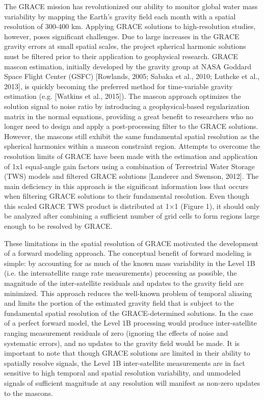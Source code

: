 \documentclass[review,oneside]{igs}
\begin{document}
The GRACE mission has revolutionized our ability to monitor global water mass variability by mapping the Earth’s gravity field each month with a spatial resolution of 300-400 km. Applying GRACE solutions to high-resolution studies, however, poses significant challenges. Due to large increases in the GRACE gravity errors at small spatial scales, the project spherical harmonic solutions must be filtered prior to their application to geophysical research. GRACE mascon estimation, initially developed by the gravity group at NASA Goddard Space Flight Center (GSFC) [Rowlands, 2005; Sabaka et al., 2010; Luthcke et al., 2013], is quickly becoming the preferred method for time-variable gravity estimation (e.g. [Watkins et al., 2015]). The mascon approach optimizes the solution signal to noise ratio by introducing a geophysical-based regularization matrix in the normal equations, providing a great benefit to researchers who no longer need to design and apply a post-processing filter to the GRACE solutions. However, the mascons still exhibit the same fundamental spatial resolution as the spherical harmonics within a mascon constraint region. Attempts to overcome the resolution limits of GRACE have been made with the estimation and application of 1x1 equal-angle gain factors using a combination of Terrestrial Water Storage (TWS) models and filtered GRACE solutions [Landerer and Swenson, 2012]. The main deficiency in this approach is the significant information loss that occurs when filtering GRACE solutions to their fundamental resolution. Even though this scaled GRACE TWS product is distributed at 1×1 (Figure 1), it should only be analyzed after combining a sufficient number of grid cells to form regions large enough to be resolved by GRACE.

These limitations in the spatial resolution of GRACE motivated the development of a forward modeling approach. The conceptual benefit of forward modeling is simple: by accounting for as much of the known mass variability in the Level 1B (i.e. the intersatellite range rate measurements) processing as possible, the magnitude of the inter-satellite residuals and updates to the gravity field are minimized. This approach reduces the well-known problem of temporal aliasing and limits the portion of the estimated gravity field that is subject to the fundamental spatial resolution of the GRACE-determined solutions. In the case of a perfect forward model, the Level 1B processing would produce inter-satellite ranging measurement residuals of zero (ignoring the effects of noise and systematic errors), and no updates to the gravity field would be made. It is important to note that though GRACE solutions are limited in their ability to spatially resolve signals, the Level 1B inter-satellite measurements are in fact sensitive to high temporal and spatial resolution variability, and unmodeled signals of sufficient magnitude at any resolution will manifest as non-zero updates to the mascons.
\end{document}

